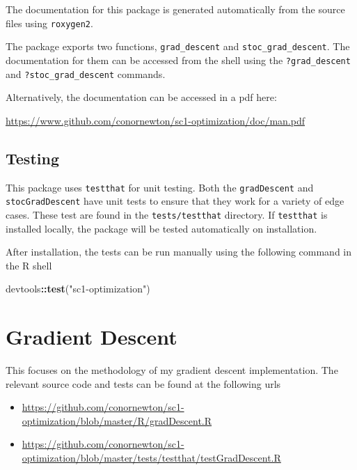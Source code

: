 \documentclass[12pt,]{article}
\newenvironment{Shaded}{\begin{snugshade}}{\end{snugshade}}
\newcommand{\KeywordTok}[1]{\textcolor[rgb]{0.13,0.29,0.53}{\textbf{#1}}}
\newcommand{\NormalTok}[1]{#1}
\newcommand{\OperatorTok}[1]{\textcolor[rgb]{0.81,0.36,0.00}{\textbf{#1}}}
\newcommand{\StringTok}[1]{\textcolor[rgb]{0.31,0.60,0.02}{#1}}
\providecommand{\tightlist}{%
  \setlength{\itemsep}{0pt}\setlength{\parskip}{0pt}}
\begin{document}
The documentation for this package is generated automatically from the
source files using \texttt{roxygen2}.

The package exports two functions, \texttt{grad\_descent} and
\texttt{stoc\_grad\_descent}. The documentation for them can be accessed
from the shell using the \texttt{?grad\_descent} and
\texttt{?stoc\_grad\_descent} commands.

Alternatively, the documentation can be accessed in a pdf here:

\url{https://www.github.com/conornewton/sc1-optimization/doc/man.pdf}

\hypertarget{testing}{%
\subsection{Testing}\label{testing}}

This package uses \texttt{testthat} for unit testing. Both the
\texttt{gradDescent} and \texttt{stocGradDescent} have unit tests to
ensure that they work for a variety of edge cases. These test are found
in the \texttt{tests/testthat} directory. If \texttt{testthat} is
installed locally, the package will be tested automatically on
installation.

After installation, the tests can be run manually using the following
command in the R shell

\begin{Shaded}
\begin{Highlighting}[]
\NormalTok{    devtools}\OperatorTok{::}\KeywordTok{test}\NormalTok{(}\StringTok{"sc1-optimization"}\NormalTok{)}
\end{Highlighting}
\end{Shaded}

\newpage

\hypertarget{gradient-descent}{%
\section{Gradient Descent}\label{gradient-descent}}

This focuses on the methodology of my gradient descent implementation.
The relevant source code and tests can be found at the following urls

\begin{itemize}
\tightlist
\item
  \url{https://github.com/conornewton/sc1-optimization/blob/master/R/gradDescent.R}
\item
  \url{https://github.com/conornewton/sc1-optimization/blob/master/tests/testthat/testGradDescent.R}
\end{itemize}
\end{document}
